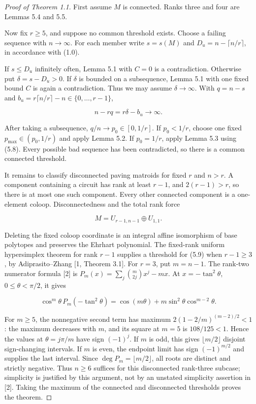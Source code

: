 \documentclass[10pt]{article}
\begin{document}
\begin{proof}[Proof of Theorem 1.1]


First assume $M$ is connected.  Ranks three and four are Lemmas 5.4 and 5.5.

Now fix $r\ge5$, and suppose no common threshold exists.
Choose a failing sequence with $n\to\infty$.
For each member write $s=s(M)$ and
$D_u=n-\lceil n/r\rceil$, in accordance with (1.0).

If $s\le D_u$ infinitely often, Lemma 5.1 with $C=0$ is a contradiction.
Otherwise put $\delta=s-D_u>0$.  If $\delta$ is bounded on a subsequence,
Lemma 5.1 with one fixed bound $C$ is again a contradiction.  Thus we may
assume $\delta\to\infty$.  With $q=n-s$ and
$b_u=r\lceil n/r\rceil-n\in\{0,\ldots,r-1\}$,

\[
 n-rq=r\delta-b_u\longrightarrow\infty. \tag{5.8}
\]

After taking a subsequence, $q/n\to p_0\in[0,1/r]$.  If $p_0<1/r$,
choose one fixed $p_{\max}\in(p_0,1/r)$ and apply Lemma 5.2.  If
$p_0=1/r$, apply Lemma 5.3 using (5.8).  Every possible bad sequence has
been contradicted, so there is a common connected threshold.

It remains to classify disconnected paving matroids for fixed $r$ and
$n>r$.  A component containing a circuit has rank at least $r-1$, and
$2(r-1)>r$, so there is at most one such component.  Every other connected
component is a one-element coloop.  Disconnectedness and the total rank force

\[
 M=U_{r-1,n-1}\oplus U_{1,1}. \tag{5.9}
\]

Deleting the fixed coloop coordinate is an integral affine isomorphism of
base polytopes and preserves the Ehrhart polynomial.  The fixed-rank uniform
hypersimplex theorem for rank $r-1$ supplies a threshold for (5.9) when
$r-1\ge3$, by Adiprasito--Zhang [1, Theorem 3.1].
For $r=3$, put $m=n-1$.  The rank-two numerator formula [2] is
$P_m(x)=\sum_j\binom m{2j}x^j-mx$.  At $x=-\tan^2\theta$,
$0\le\theta<\pi/2$, it gives

\[
 \cos^m\theta\,P_m(-\tan^2\theta)
 =\cos(m\theta)+m\sin^2\theta\cos^{m-2}\theta.
\]

For $m\ge5$, the nonnegative second term has maximum
$2(1-2/m)^{(m-2)/2}<1$: the maximum decreases with $m$, and its
square at $m=5$ is $108/125<1$.  Hence the values at
$\theta=j\pi/m$ have sign $(-1)^j$.  If $m$ is odd, this gives
$\lfloor m/2\rfloor$ disjoint sign-changing intervals.  If $m$ is
even, the endpoint limit has sign $(-1)^{m/2}$ and supplies the last
interval.  Since $\deg P_m=\lfloor m/2\rfloor$, all roots are distinct
and strictly negative.  Thus $n\ge6$ suffices for this disconnected
rank-three subcase; simplicity is justified by this argument, not by an
unstated simplicity assertion in [2].  Taking
the maximum of the connected and disconnected thresholds proves the theorem.

\end{proof}
\end{document}
